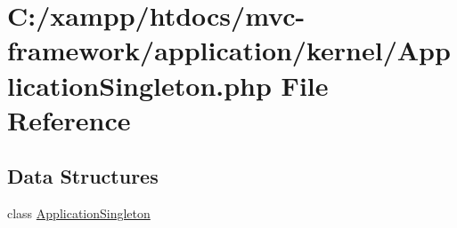 \hypertarget{_application_singleton_8php}{}\section{C\+:/xampp/htdocs/mvc-\/framework/application/kernel/\+Application\+Singleton.php File Reference}
\label{_application_singleton_8php}
\subsection*{Data Structures}
\begin{DoxyCompactItemize}
\item 
class \hyperlink{class_application_singleton}{Application\+Singleton}
\end{DoxyCompactItemize}
